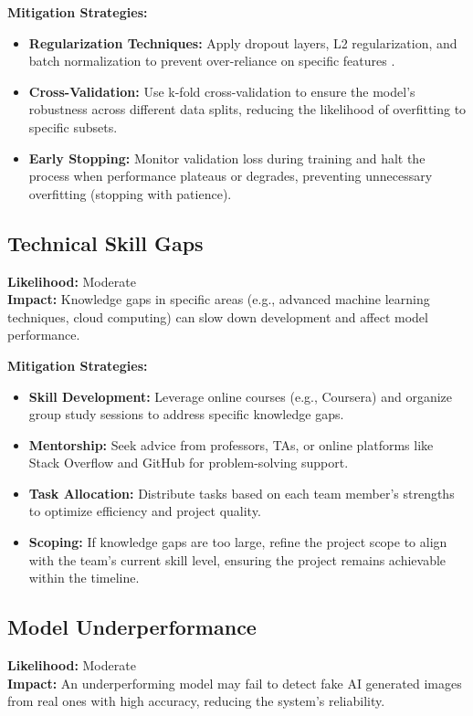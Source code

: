 \documentclass{article} %
\begin{document}
\textbf{Mitigation Strategies:}
\begin{itemize}
    \item \textbf{Regularization Techniques:} Apply dropout layers, L2 regularization, and batch normalization to prevent over-reliance on specific features \citep{srivastava2014}.
    \item \textbf{Cross-Validation:} Use k-fold cross-validation to ensure the model's robustness across different data splits, reducing the likelihood of overfitting to specific subsets.
    \item \textbf{Early Stopping:} Monitor validation loss during training and halt the process when performance plateaus or degrades, preventing unnecessary overfitting (stopping with patience).
\end{itemize}

\subsection{Technical Skill Gaps}
\textbf{Likelihood:} Moderate \\
\textbf{Impact:} Knowledge gaps in specific areas (e.g., advanced machine learning techniques, cloud computing) can slow down development and affect model performance.

\textbf{Mitigation Strategies:}
\begin{itemize}
    \item \textbf{Skill Development:} Leverage online courses (e.g., Coursera) and organize group study sessions to address specific knowledge gaps.
    \item \textbf{Mentorship:} Seek advice from professors, TAs, or online platforms like Stack Overflow and GitHub for problem-solving support.
    \item \textbf{Task Allocation:} Distribute tasks based on each team member's strengths to optimize efficiency and project quality.
    \item \textbf{Scoping:} If knowledge gaps are too large, refine the project scope to align with the team's current skill level, ensuring the project remains achievable within the timeline.
\end{itemize}

\subsection{Model Underperformance}
\textbf{Likelihood:} Moderate \\
\textbf{Impact:} An underperforming model may fail to detect fake AI generated images from real ones with high accuracy, reducing the system's reliability.
\end{document}
